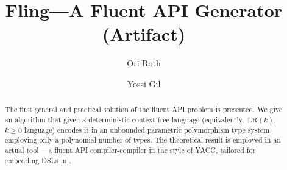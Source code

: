 \documentclass[a4paper,UKenglish,cleveref, autoref]{darts-v2019}
\title{Fling---A Fluent API Generator (Artifact)}
\author{Ori Roth}{Technion I.I.T Computer Science Dept., Haifa, Israel}{ori.rothh@gmail.com}{}{Technion I.I.T}%
\author{Yossi Gil}{Technion I.I.T Computer Science Dept., Haifa, Israel}{yogi@cs.technion.ac.il}{}{Technion I.I.T}
\begin{document}
\maketitle

\begin{abstract}
The first general and practical solution of the fluent API problem is
presented. We give an algorithm that given a deterministic context free
language (equivalently,~$\text{LR}(k)$,~$k≥0$ language) encodes it in an
unbounded parametric polymorphism type system employing only a polynomial
number of types. The theoretical result is employed in an actual tool
\Fling---a fluent API compiler-compiler in the style of YACC, tailored for
embedding DSLs in .


\end{abstract}

\end{document}
